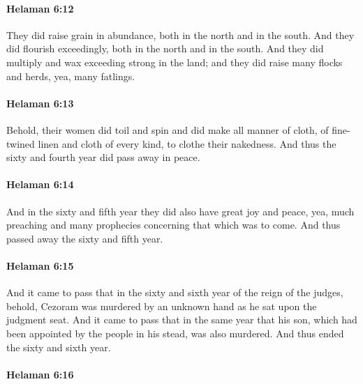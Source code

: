 		\paragraph{Helaman 6:12} %
			\label{HELAMAN-6-12}

			They did raise grain in abundance, both in the north and in the south.
			And they did flourish exceedingly, both in the north and in the south.
			And they did multiply and wax exceeding strong in the land;
			and they did raise many flocks and herds, yea, many fatlings.

		\paragraph{Helaman 6:13} %
			\label{HELAMAN-6-13}

			Behold, their women did toil and spin
			and did make all manner of cloth,
			of fine-twined linen and cloth of every kind,
			to clothe their nakedness.
			And thus the sixty and fourth year did pass away in peace.

		\paragraph{Helaman 6:14} %
			\label{HELAMAN-6-14}

			And in the sixty and fifth year they did also have great joy and peace,
			yea, much preaching and many prophecies concerning that which was to come.
			And thus passed away the sixty and fifth year.

		\paragraph{Helaman 6:15} %
			\label{HELAMAN-6-15}

			And it came to pass that in the sixty and sixth year of the reign of the judges,
			behold, Cezoram was murdered by an unknown hand
			as he sat upon the judgment seat.
			And it came to pass that in the same year
			that his son, which had been appointed by the people in his stead,
			was also murdered.
			And thus ended the sixty and sixth year.

		\paragraph{Helaman 6:16} %
			\label{HELAMAN-6-16}

